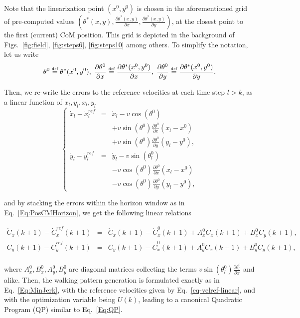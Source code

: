 Note that the linearization point $(x^0,y^0)$ is chosen in the aforementioned grid of pre-computed values $(\theta^*(x,y),\frac{\partial \theta^*(x,y)}{\partial x},  \frac{\partial \theta^*(x,y)}{\partial y})$, at the closest point to the first (current) CoM position. This grid is depicted in the background of Figs.~\ref{fig:field}, \ref{fig:steps6}, \ref{fig:steps10} among others. To simplify the notation, let us write
$$
\theta^0 \stackrel{\mbox{\tiny def}}{=}  \theta^*(x^0,y^0),\;
\frac{\partial \theta^0}{\partial x} \stackrel{\mbox{\tiny def}}{=} \frac{\partial \theta^*(x^0,y^0)}{\partial x},\;
\frac{\partial \theta^0}{\partial y} \stackrel{\mbox{\tiny def}}{=}  \frac{\partial \theta^*(x^0,y^0)}{\partial y}. 
$$


Then, we re-write the errors to the reference velocities at each time step $l>k$, as a linear function of $\dot{x}_l,\dot{y}_l,x_l,y_l$
$$
\left\{
\begin{array}{ccc}
\dot{x}_l-\dot{x}^{ref}_l & = & \dot{x}_l - v\cos(\theta^0)\\
&& + v\sin(\theta^0) \frac{\partial \theta^0}{\partial x}  (x_l-x^0)\\
&& + v\sin(\theta^0) \frac{\partial \theta^0}{\partial y}  (y_l-y^0),\\
\dot{y}_l-\dot{y}^{ref}_l & = & \dot{y}_l - v\sin(\theta^0_l)\\
&& - v\cos(\theta^0) \frac{\partial \theta^0}{\partial x}  (x_l-x^0)\\
&& - v\cos(\theta^0) \frac{\partial \theta^0}{\partial y}  (y_l-y^0),
\end{array}
\right.
$$ 

\noindent and by stacking the errors within the horizon window as in Eq.~\ref{Eq:PosCMHorizon}, we get the following 
linear relations

{\small
\begin{eqnarray}
\nonumber
 \dot{C}_x(k+1)  - \dot{C}_x^{ref}(k+1) & = &    \dot{C}_{x}(k+1) -   \dot{C}^{0}_x(k+1)  + A^0_{x} C_{x}(k+1)  + B_x^{0} C_{y}(k+1),\\
\nonumber
 \dot{C}_{y}(k+1) - \dot{C}_y^{ref}(k+1) & = &   \dot{C}_{y}(k+1) - \dot{C}^0_x(k+1) + A^0_{y} C_{x}(k+1) + B^0_{y}  C_y(k+1),\\
 \label{eq-velref-linear}
 \end{eqnarray}
}

\noindent where $A^0_{x},B^0_{x},A^0_{y},B^0_{y}$ are diagonal matrices collecting the terms $v\sin(\theta^0_l) \frac{\partial \theta^0_l}{\partial x}$ and alike. Then, the walking pattern generation is formulated exactly as in Eq.~\ref{Eq:MinJerk}, with the reference velocities given by Eq.~\ref{eq-velref-linear}, and with the optimization variable being $U(k)$,
leading to a canonical Quadratic Program (QP) similar to Eq.~\ref{Eq:QP}.


